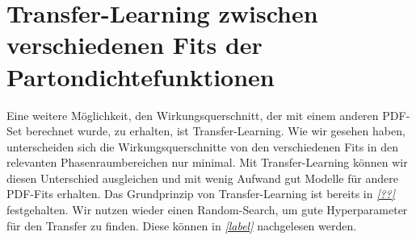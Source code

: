 \section{Transfer-Learning zwischen verschiedenen Fits der Partondichtefunktionen}
Eine weitere Möglichkeit, den Wirkungsquerschnitt, der mit einem anderen PDF-Set berechnet wurde, zu erhalten, ist Transfer-Learning. Wie wir gesehen haben, unterscheiden sich die Wirkungsquerschnitte von den verschiedenen Fits in den relevanten Phasenraumbereichen nur minimal. Mit Transfer-Learning können wir diesen Unterschied ausgleichen und mit wenig Aufwand gut Modelle für andere PDF-Fits erhalten. Das Grundprinzip von Transfer-Learning ist bereits in \textit{\autoref{??}} festgehalten. Wir nutzen wieder einen Random-Search, um gute Hyperparameter für den Transfer zu finden. Diese können in \textit{\autoref{label}} nachgelesen werden.\\

